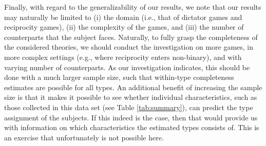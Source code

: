 \documentclass[11pt,a4paper]{article}
\theoremstyle{definition}
\begin{document}
Finally, with regard to the generalizability of our results, we note that our results may naturally be limited to (i) the domain (i.e., that of dictator games and reciprocity games), (ii) the complexity of the games, and (iii) the number of counterparts that the subject faces. Naturally, to fully grasp the completeness of the considered theories, we should conduct the investigation on more games, in more complex settings (e.g., where reciprocity enters non-binary), and with varying number of counterparts. As our investigation indicates, this should be done with a much larger sample size, such that within-type completeness estimates are possible for all types. An additional benefit of increasing the sample size is that it makes it possible to see whether individual characteristics, such as those collected in this data set (see Table \ref{tab:summary}), can predict the type assignment of the subjects. If this indeed is the case, then that would provide us with information on which characteristics the estimated types consists of. This is an exercise that unfortunately is not possible here.
\end{document}
